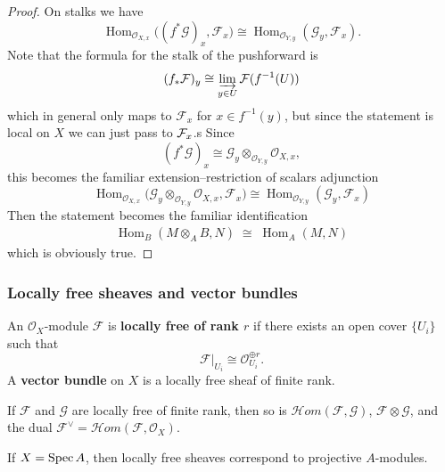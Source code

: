 \documentclass[12pt]{article}
\begin{document}
\begin{proof} On stalks we have
    \[
        \operatorname{Hom}_{\mathcal O_{X,x}}
        \bigl((f^*\mathcal G)_x,\mathcal F_x\bigr)
        \cong
        \operatorname{Hom}_{\mathcal O_{Y,y}}(\mathcal G_y,\mathcal F_x).
    \]
    Note that the formula for the stalk of the pushforward is
    \[
        (f_*\mathcal F)_y
        \cong
        \varinjlim_{y\in U} \mathcal F(f^{-1}(U))
    \]
    which in general only maps to $\mathcal F_x$ for $x \in f^{-1}(y)$, but since the statement is local on $X$ we can just pass to ${\mathcal{F}}_x$.s
    Since
    \[
        (f^*\mathcal G)_x
        \cong
        \mathcal G_y\otimes_{\mathcal O_{Y,y}}\mathcal O_{X,x},
    \]
    this becomes the familiar extension--restriction of scalars adjunction
    \[
        \operatorname{Hom}_{\mathcal O_{X,x}}
        \bigl(\mathcal G_y\otimes_{\mathcal O_{Y,y}}\mathcal O_{X,x},\mathcal F_x\bigr)
        \cong
        \operatorname{Hom}_{\mathcal O_{Y,y}}(\mathcal G_y,\mathcal F_x)
    \]
    Then the statement becomes the familiar identification \begin{align*}
        \operatorname{Hom}_B(M\otimes_A B, N)
        \;\cong\;
        \operatorname{Hom}_A(M,N)
    \end{align*} which is obviously true. \end{proof}

\subsubsection{Locally free sheaves and vector bundles}

\begin{definition}
    An $\mathcal O_X$-module $\mathcal F$ is \textbf{locally free of rank $r$} if there exists an open cover $\{U_i\}$ such that
    \[
        \mathcal F|_{U_i} \cong \mathcal O_{U_i}^{\oplus r}.
    \]
    A \textbf{vector bundle} on $X$ is a locally free sheaf of finite rank.
\end{definition}

If $\mathcal F$ and $\mathcal G$ are locally free of finite rank, then so is $\mathcal{H}om(\mathcal F,\mathcal G)$, $\mathcal F \otimes \mathcal G$, and the dual $\mathcal F^\vee = \mathcal{H}om(\mathcal F,\mathcal O_X)$.

\begin{proposition}
    If $X=\operatorname{Spec} A$, then locally free sheaves correspond to projective $A$-modules.
\end{proposition}
\end{document}
